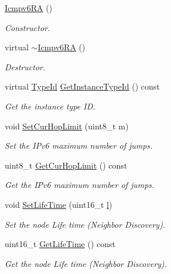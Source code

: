 \begin{DoxyCompactItemize}
\item 
\hyperlink{classns3_1_1Icmpv6RA_a04b8993864c2c8d43497117d13cfff58}{Icmpv6\+RA} ()
\begin{DoxyCompactList}\small\item\em Constructor. \end{DoxyCompactList}\item 
virtual \hyperlink{classns3_1_1Icmpv6RA_ad62a36b2aca649b95ad0fdfb8b64ec29}{$\sim$\+Icmpv6\+RA} ()
\begin{DoxyCompactList}\small\item\em Destructor. \end{DoxyCompactList}\item 
virtual \hyperlink{classns3_1_1TypeId}{Type\+Id} \hyperlink{classns3_1_1Icmpv6RA_a67546a14189ff9ffa2ca271442583b8c}{Get\+Instance\+Type\+Id} () const 
\begin{DoxyCompactList}\small\item\em Get the instance type ID. \end{DoxyCompactList}\item 
void \hyperlink{classns3_1_1Icmpv6RA_a5a507ccaa90dde3818a86e7744d7ef46}{Set\+Cur\+Hop\+Limit} (uint8\+\_\+t m)
\begin{DoxyCompactList}\small\item\em Set the I\+Pv6 maximum number of jumps. \end{DoxyCompactList}\item 
uint8\+\_\+t \hyperlink{classns3_1_1Icmpv6RA_af223991bb4f9859f0373737a01b265ea}{Get\+Cur\+Hop\+Limit} () const 
\begin{DoxyCompactList}\small\item\em Get the I\+Pv6 maximum number of jumps. \end{DoxyCompactList}\item 
void \hyperlink{classns3_1_1Icmpv6RA_a103f5d0fefed7ba9adcf96ed92d2c47f}{Set\+Life\+Time} (uint16\+\_\+t \hyperlink{lte__pathloss_8m_a5b54c0a045f179bcbbbc9abcb8b5cd4c}{l})
\begin{DoxyCompactList}\small\item\em Set the node Life time (Neighbor Discovery). \end{DoxyCompactList}\item 
uint16\+\_\+t \hyperlink{classns3_1_1Icmpv6RA_a2a81d15062d9649803ba186e49fafd74}{Get\+Life\+Time} () const 
\begin{DoxyCompactList}\small\item\em Get the node Life time (Neighbor Discovery). \end{DoxyCompactList}\item 

\end{DoxyCompactItemize}
